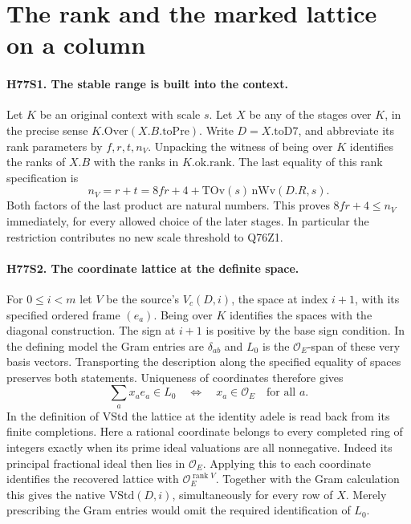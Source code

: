 \section{The rank and the marked lattice on a column}

\paragraph{H77S1. The stable range is built into the context.}
Let $K$ be an original context with scale $s$. Let $X$ be any of the
stages over $K$, in the precise sense $K.\mathrm{Over}(X.B.\mathrm{toPre})$.
Write $D=X.\mathrm{toD7}$, and abbreviate its rank parameters by
$f,r,t,n_V$. Unpacking the witness of being over $K$ identifies
the ranks of $X.B$ with the ranks in $K.\mathrm{ok.rank}$. The last
equality of this rank specification is
\[
 n_V=r+t=8fr+4+\mathrm{TOv}(s)\,\mathrm{nWv}(D.R,s).
\]
Both factors of the last product are natural numbers. This proves
$8fr+4\le n_V$ immediately, for every allowed choice of the later
stages. In particular the restriction contributes no new scale
threshold to Q76Z1.

\paragraph{H77S2. The coordinate lattice at the definite space.}
For $0\le i<m$ let $V$ be the source's $V_c(D,i)$, the space
at index $i+1$, with its specified ordered frame $(e_a)$.
Being over $K$ identifies the spaces with the diagonal construction.
The sign at $i+1$ is positive by the base sign condition.
In the defining model the Gram entries are $\delta_{ab}$ and
$L_0$ is the $\mathcal O_E$-span of these very basis vectors.
Transporting the description along the specified equality of spaces
preserves both statements. Uniqueness of coordinates therefore gives
\[
  \sum_a x_a e_a\in L_0
     \quad\Longleftrightarrow\quad x_a\in\mathcal O_E\quad\text{for all }a.
\]
In the definition of $\mathrm{VStd}$ the lattice at the identity
adele is read back from its finite completions. Here a rational
coordinate belongs to every completed ring of integers exactly
when its prime ideal valuations are all nonnegative. Indeed its
principal fractional ideal then lies in $\mathcal O_E$. Applying
this to each coordinate identifies the recovered lattice with
$\mathcal O_E^{\operatorname{rank} V}$. Together with the Gram
calculation this gives the native $\mathrm{VStd}(D,i)$, simultaneously
for every row of $X$. Merely prescribing the Gram entries would omit
the required identification of $L_0$.


